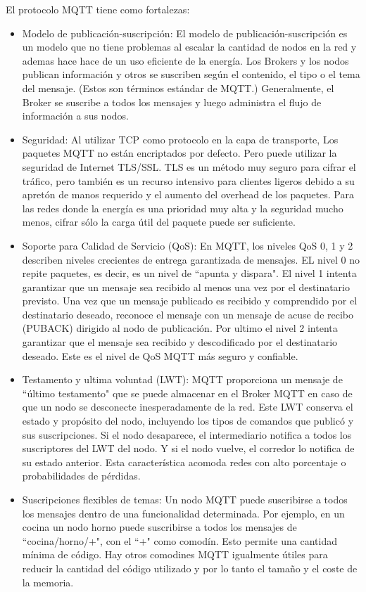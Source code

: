 El protocolo MQTT tiene como fortalezas:
\begin{itemize}
\item Modelo de publicación-suscripción: El modelo de publicación-suscripción es un modelo que no tiene problemas al escalar la cantidad de nodos en la red y ademas hace hace de un uso eficiente de la energía. Los Brokers y los nodos publican información y otros se suscriben según el contenido, el tipo o el tema del mensaje. (Estos son términos estándar de MQTT.) Generalmente, el Broker se suscribe a todos los mensajes y luego administra el flujo de información a sus nodos.
\item Seguridad: Al utilizar TCP como protocolo en la capa de transporte, Los paquetes MQTT no están encriptados por defecto. Pero puede utilizar la seguridad de Internet TLS/SSL. TLS es un método muy seguro para cifrar el tráfico, pero también es un recurso intensivo para clientes ligeros debido a su apretón de manos requerido y el aumento del overhead de los paquetes. Para las redes donde la energía es una prioridad muy alta y la seguridad mucho menos, cifrar sólo la carga útil del paquete puede ser suficiente.
\item Soporte para Calidad de Servicio (QoS): En MQTT, los niveles QoS 0, 1 y 2 describen niveles crecientes de entrega garantizada de mensajes. EL nivel 0 no repite paquetes, es decir, es un nivel de ``apunta y dispara". El nivel 1 intenta garantizar que un mensaje sea recibido al menos una vez por el destinatario previsto. Una vez que un mensaje publicado es recibido y comprendido por el destinatario deseado, reconoce el mensaje con un mensaje de acuse de recibo (PUBACK) dirigido al nodo de publicación. Por ultimo el nivel 2 intenta garantizar que el mensaje sea recibido y descodificado por el destinatario deseado. Este es el nivel de QoS MQTT más seguro y confiable. 
\item Testamento y ultima voluntad (LWT): MQTT proporciona un mensaje de ``último testamento" que se puede almacenar en el Broker MQTT en caso de que un nodo se desconecte inesperadamente de la red. Este LWT conserva el estado y propósito del nodo, incluyendo los tipos de comandos que publicó y sus suscripciones. Si el nodo desaparece, el intermediario notifica a todos los suscriptores del LWT del nodo. Y si el nodo vuelve, el corredor lo notifica de su estado anterior. Esta característica acomoda redes con alto porcentaje o probabilidades de  pérdidas.
\item Suscripciones flexibles de temas: Un nodo MQTT puede suscribirse a todos los mensajes dentro de una funcionalidad determinada. Por ejemplo, en un cocina un nodo horno puede suscribirse a todos los mensajes de ``cocina/horno/+", con el ``+" como comodín. Esto permite una cantidad mínima de código. Hay otros comodines MQTT igualmente útiles para reducir la cantidad del código utilizado y por lo tanto el tamaño y el coste de la memoria.
\end{itemize}

